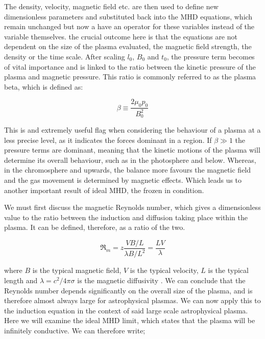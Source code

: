 \noindent The density, velocity, magnetic field etc. are then used to define new dimensionless parameters and substituted back into the MHD equations, which remain unchanged but now a have an operator for these variables instead of the variable themselves.
the crucial outcome here is that the equations are not dependent on the size of the plasma evaluated, the magnetic field strength, the density or the time scale.
After scaling $l_0$, $B_0$ and $t_0$, the pressure term becomes of vital importance and is linked to the ratio between the kinetic pressure of the plasma and magnetic pressure.
This ratio is commonly referred to as the plasma beta, which is defined as:

\begin{equation}
	\beta \equiv \frac{2\mu_0p_0}{B_0^2}
\end{equation} 

\noindent This is and extremely useful flag when considering the behaviour of a plasma at a less precise level, as it indicates the forces dominant in a region.
If $\beta \gg 1$ the pressure terms are dominant, meaning that the kinetic motions of the plasma will determine its overall behaviour, such as in the photosphere and below.
Whereas, in the chromosphere and upwards, the balance more favours the magnetic field and the gas movement is determined by magnetic effects.
Which leads us to another important result of ideal MHD, the frozen in condition.

We must first discuss the magnetic Reynolds number, which gives a dimensionless value to the ratio between the induction and diffusion taking place within the plasma.
It can be defined, therefore, as a ratio of the two.

\begin{equation}
	\Re_m = z\frac{VB/L}{\lambda B/L^2} = \frac{LV}{\lambda} 
\end{equation}

\noindent where $B$ is the typical magnetic field, $V$ is the typical velocity, $L$ is the typical length and $\lambda = c^2/{4\pi\sigma}$ is the magnetic diffusivity \citep{Choudhuri1998}.
We can conclude that the Reynolds number depends significantly on the overall size of the plasma, and is therefore almost always large for astrophysical plasmas.
We can now apply this to the induction equation in the context of said large scale astrophysical plasma.
Here we will examine the ideal MHD limit, which states that the plasma will be infinitely conductive. 
We can therefore write;

